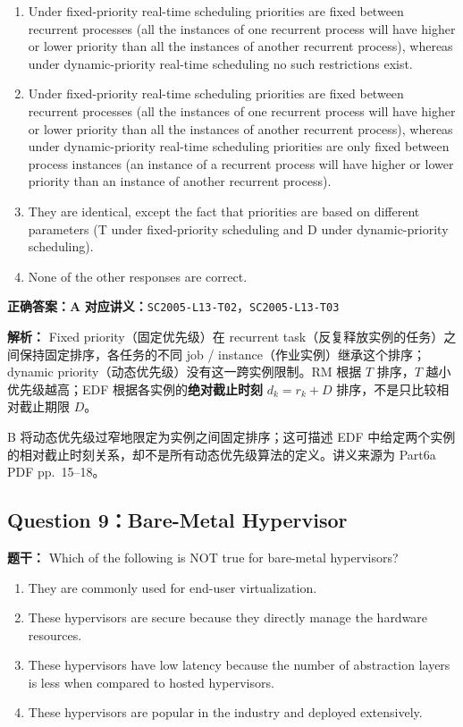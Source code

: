 \documentclass[11pt,a4paper,fontset=fandol]{ctexart}
\renewcommand{\exercisequestion}[2]{%
  \Needspace{5\baselineskip}%
  \subsection{#2}\label{exercise:#1}%
}
\renewenvironment{checkedsolution}
  {\par\nopagebreak[4]\textbf{解析：}\ignorespaces}
  {\par}
\begin{document}
\begin{enumerate}[label=\Alph*.,leftmargin=2.4em]
  \item Under fixed-priority real-time scheduling priorities are fixed between recurrent processes (all the instances of one recurrent process will have higher or lower priority than all the instances of another recurrent process), whereas under dynamic-priority real-time scheduling no such restrictions exist.
  \item Under fixed-priority real-time scheduling priorities are fixed between recurrent processes (all the instances of one recurrent process will have higher or lower priority than all the instances of another recurrent process), whereas under dynamic-priority real-time scheduling priorities are only fixed between process instances (an instance of a recurrent process will have higher or lower priority than an instance of another recurrent process).
  \item They are identical, except the fact that priorities are based on different parameters (T under fixed-priority scheduling and D under dynamic-priority scheduling).
  \item None of the other responses are correct.
\end{enumerate}

\textbf{正确答案：A}\qquad
\textbf{对应讲义：}\texttt{SC2005-L13-T02}，\texttt{SC2005-L13-T03}

\begin{checkedsolution}
Fixed priority（固定优先级）在 recurrent task（反复释放实例的任务）之间保持固定排序，各任务的不同 job / instance（作业实例）继承这个排序；dynamic priority（动态优先级）没有这一跨实例限制。RM 根据 $T$ 排序，$T$ 越小优先级越高；EDF 根据各实例的\textbf{绝对截止时刻} $d_k=r_k+D$ 排序，不是只比较相对截止期限 $D$。

B 将动态优先级过窄地限定为实例之间固定排序；这可描述 EDF 中给定两个实例的相对截止时刻关系，却不是所有动态优先级算法的定义。讲义来源为 Part6a PDF pp.~15--18。
\end{checkedsolution}

\exercisequestion{SC2005-HW04-Q09}{Question 9：Bare-Metal Hypervisor}

\textbf{题干：} Which of the following is NOT true for bare-metal hypervisors?

\begin{enumerate}[label=\Alph*.,leftmargin=2.4em]
  \item They are commonly used for end-user virtualization.
  \item These hypervisors are secure because they directly manage the hardware resources.
  \item These hypervisors have low latency because the number of abstraction layers is less when compared to hosted hypervisors.
  \item These hypervisors are popular in the industry and deployed extensively.
\end{enumerate}
\end{document}
